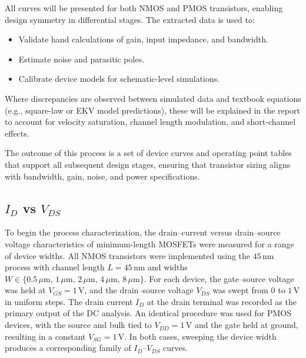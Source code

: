 \documentclass[11pt]{article}
\begin{document}
All curves will be presented for both NMOS and PMOS transistors, enabling design symmetry in differential stages. The extracted data is used to:

\begin{itemize}
    \item Validate hand calculations of gain, input impedance, and bandwidth.
    \item Estimate noise and parasitic poles.
    \item Calibrate device models for schematic-level simulations.
\end{itemize}

Where discrepancies are observed between simulated data and textbook equations (e.g., square-law or EKV model predictions), these will be explained in the report to account for velocity saturation, channel length modulation, and short-channel effects.

The outcome of this process is a set of device curves and operating point tables that support all subsequent design stages, ensuring that transistor sizing aligns with bandwidth, gain, noise, and power specifications.


\newpage

\subsection{$I_D$ vs $V_{DS}$}

To begin the process characterization, the drain--current versus drain--source
voltage characteristics of minimum-length MOSFETs were measured for a range of
device widths. All NMOS transistors were implemented using the $45\,\mathrm{nm}$
process with channel length $L = 45\,\mathrm{nm}$ and widths
$W \in \{0.5\,\mu\mathrm{m},\, 1\,\mu\mathrm{m},\, 2\,\mu\mathrm{m},\, 4\,\mu\mathrm{m},\, 8\,\mu\mathrm{m}\}$.
For each device, the gate--source voltage was held at $V_{GS} = 1\,\mathrm{V}$,
and the drain--source voltage $V_{DS}$ was swept from $0$ to $1\,\mathrm{V}$ in uniform
steps. The drain current $I_D$ at the drain terminal was recorded as the primary
output of the DC analysis. An identical procedure was used for PMOS devices,
with the source and bulk tied to $V_{DD} = 1\,\mathrm{V}$ and the gate held at
ground, resulting in a constant $V_{SG} = 1\,\mathrm{V}$. In both cases, sweeping
the device width produces a corresponding family of $I_D$--$V_{DS}$ curves.
\end{document}
